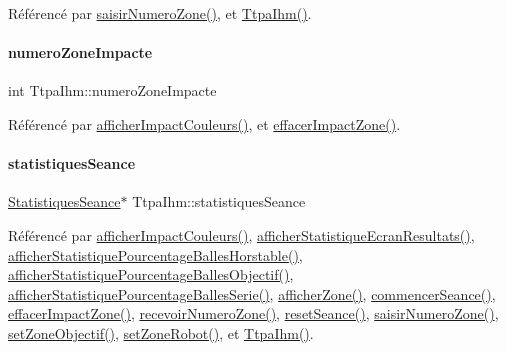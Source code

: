 Référencé par \hyperlink{class_ttpa_ihm_a9b22616e3a4e52ad2ecfe1818d5fadb2}{saisir\+Numero\+Zone()}, et \hyperlink{class_ttpa_ihm_ab3ed4b37a93ff04842414d4a98861d66}{Ttpa\+Ihm()}.

\mbox{\label{class_ttpa_ihm_af8fa0aee928ee727f27ff605c0c1d991}} 
\paragraph{\texorpdfstring{numero\+Zone\+Impacte}{numeroZoneImpacte}}
{\footnotesize\ttfamily int Ttpa\+Ihm\+::numero\+Zone\+Impacte\hspace{0.3cm}{\ttfamily [private]}}



Référencé par \hyperlink{class_ttpa_ihm_a6e3cd3828ce5d165497e343bdb15cd87}{afficher\+Impact\+Couleurs()}, et \hyperlink{class_ttpa_ihm_abe9973c64673cdaa067617f9246781d2}{effacer\+Impact\+Zone()}.

\mbox{\label{class_ttpa_ihm_abed6897d6f7b4d3a5eb8dcc07651e740}} 
\paragraph{\texorpdfstring{statistiques\+Seance}{statistiquesSeance}}
{\footnotesize\ttfamily \hyperlink{class_statistiques_seance}{Statistiques\+Seance}$\ast$ Ttpa\+Ihm\+::statistiques\+Seance\hspace{0.3cm}{\ttfamily [private]}}



Référencé par \hyperlink{class_ttpa_ihm_a6e3cd3828ce5d165497e343bdb15cd87}{afficher\+Impact\+Couleurs()}, \hyperlink{class_ttpa_ihm_aa480a02532144d0f99af027b5b201ae1}{afficher\+Statistique\+Ecran\+Resultats()}, \hyperlink{class_ttpa_ihm_a58058063eb377b4c4c48048e4bf84e77}{afficher\+Statistique\+Pourcentage\+Balles\+Horstable()}, \hyperlink{class_ttpa_ihm_ac37d57d13301cda22f062219de8731c4}{afficher\+Statistique\+Pourcentage\+Balles\+Objectif()}, \hyperlink{class_ttpa_ihm_aec988dc2398578eb8e91563d1ba58cde}{afficher\+Statistique\+Pourcentage\+Balles\+Serie()}, \hyperlink{class_ttpa_ihm_a3b00f90707811240c7dcfe8ed3dce783}{afficher\+Zone()}, \hyperlink{class_ttpa_ihm_a9bf7a4cddbdbf786d781e4d084409068}{commencer\+Seance()}, \hyperlink{class_ttpa_ihm_abe9973c64673cdaa067617f9246781d2}{effacer\+Impact\+Zone()}, \hyperlink{class_ttpa_ihm_a0070bf0027c8a903e5bb5a543533e82c}{recevoir\+Numero\+Zone()}, \hyperlink{class_ttpa_ihm_a521fea1cb4384157e5422a033e9a4d4f}{reset\+Seance()}, \hyperlink{class_ttpa_ihm_a9b22616e3a4e52ad2ecfe1818d5fadb2}{saisir\+Numero\+Zone()}, \hyperlink{class_ttpa_ihm_a3fd5b5d097f8a52df6fc8dd6d59b1374}{set\+Zone\+Objectif()}, \hyperlink{class_ttpa_ihm_abda1a93ec09ec404b129e08876faa5f8}{set\+Zone\+Robot()}, et \hyperlink{class_ttpa_ihm_ab3ed4b37a93ff04842414d4a98861d66}{Ttpa\+Ihm()}.

